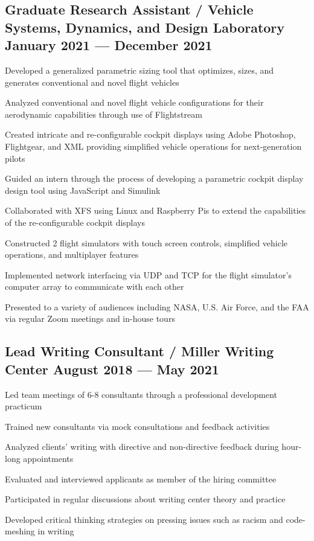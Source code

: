 \documentclass[letter,10pt]{article}
\begin{document}
\subsection{{Graduate Research Assistant / Vehicle Systems, Dynamics, and Design Laboratory \hfill January 2021 --- December 2021}}
\begin{zitemize}
    \item Developed a generalized parametric sizing tool that optimizes, sizes, and generates conventional and novel flight vehicles
    \item Analyzed conventional and novel flight vehicle configurations for their aerodynamic capabilities through use of Flightstream
    \item Created intricate and re-configurable cockpit displays using Adobe Photoshop, Flightgear, and XML providing simplified vehicle operations for next-generation
    pilots
    \item Guided an intern through the process of developing a parametric cockpit display design tool using JavaScript and Simulink
    \item Collaborated with XFS using Linux and Raspberry Pis to extend the capabilities of the re-configurable cockpit displays
    \item Constructed 2 flight simulators with touch screen controls, simplified vehicle operations, and multiplayer features
    \item Implemented network interfacing via UDP and TCP for the flight simulator's computer array to communicate with each other
    \item Presented to a variety of audiences including NASA, U.S. Air Force, and the FAA via regular Zoom meetings and in-house tours
\end{zitemize}

\subsection{{Lead Writing Consultant / Miller Writing Center \hfill August 2018 --- May 2021}}
\begin{zitemize}
    \item Led team meetings of 6-8 consultants through a professional development practicum
    \item Trained new consultants via mock consultations and feedback activities
    \item Analyzed clients' writing with directive and non-directive feedback during hour-long appointments
    \item Evaluated and interviewed applicants as member of the hiring committee
    \item Participated in regular discussions about writing center theory and practice
    \item Developed critical thinking strategies on pressing issues such as racism and code-meshing in writing
\end{zitemize}
\end{document}
